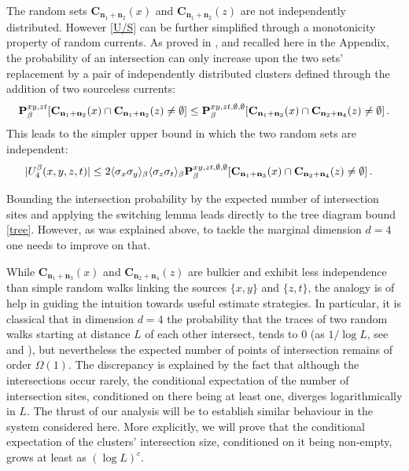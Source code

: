 \documentclass[a4paper,oneside,11pt]{article}
\newcommand{\be}[1]{\begin{equation}\label{#1}}
\newcommand{\ee}{\end{equation}}
\numberwithin{equation}{section}
\numberwithin{equation}{section}
\numberwithin{equation}{section}
\def\be{\begin{equation}}
\def\ee{\end{equation}}
\newcommand{\n}{\mathbf{n}}
\begin{document}
The random sets  ${\mathbf C}_{\n_1+\n_2}(x)$ and $ {\mathbf C}_{\n_1+\n_2}(z)$ are not independently distributed.  However \eqref{U/S} can be further simplified through a  monotonicity property of random currents.  As  proved in \cite{Aiz82},  and recalled here in the Appendix, the probability of an intersection can only increase upon the two sets' replacement by a pair of  independently distributed  clusters defined through the addition of two sourceless currents: 
\be {\bf P}^{xy,zt}_\beta[{\mathbf C}_{\n_1+\n_2}(x)\cap {\mathbf C}_{\n_1+\n_2}(z)\ne \emptyset]\le {\bf P}^{xy,zt,\emptyset,\emptyset}_\beta[{\mathbf C}_{\n_1+\n_3}(x)\cap {\mathbf C}_{\n_2+\n_4}(z)\ne \emptyset]\,.
\ee
This leads to the simpler upper bound in which the two random sets are independent:
 \begin{align}\label{eq:inter} |U_4^\beta(x,y,z,t)|   & \leq    2\langle \sigma_x\sigma_y\rangle_\beta\langle \sigma_z\sigma_t\rangle_\beta{\bf P}^{xy,zt,\emptyset,\emptyset}_\beta[ {\mathbf C}_{\n_1+\n_3}(x)\cap{\mathbf C}_{\n_2+\n_4}(z)\ne \emptyset] \,.  
 \end{align}


Bounding the intersection probability by the expected number of intersection sites and applying the switching lemma leads directly to the tree diagram bound \eqref{tree}.   However, as was explained above, to tackle the marginal dimension $d=4$ one needs to improve on that.  

While ${\mathbf C}_{\n_1+\n_3}(x)$ and ${\mathbf C}_{\n_2+\n_4}(z)$ are bulkier and exhibit less independence  than simple random walks linking the sources $\{x,y\}$ and $\{z,t\}$, the analogy is of help in guiding the intuition towards useful estimate strategies.  
 In particular, it is classical that in dimension  $d=4$    the  probability that the traces of two random walks  starting at  distance 
 $L $ of each other intersect,  tends to $0$ (as $1/\log L$, see \cite[(2.8)]{Aiz85} and \cite{Law13}), but  nevertheless  the expected number of  points of  intersection remains of order $\Omega(1)$.    The discrepancy is explained by the fact that although the  intersections occur rarely, the conditional expectation of the number of intersection sites, conditioned on there being at least one, diverges logarithmically in $L$.  The thrust of our analysis will be to establish  similar behaviour in the system considered here.  More explicitly, we will prove that the conditional expectation of the clusters' intersection size, conditioned on it being non-empty, grows at least as  $(\log L)^c$. 
\end{document}
